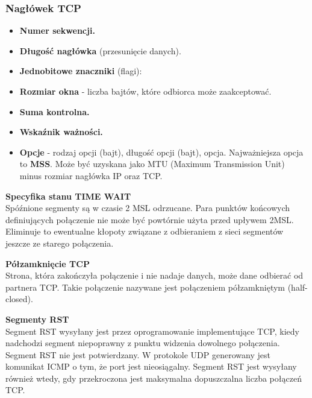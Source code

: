 \documentclass[../main.tex]{subfiles}
\begin{document}
    \subsubsection{Nagłówek TCP}
    \begin{itemize}
        \item \textbf{Numer sekwencji.}\\
        \item \textbf{Długość nagłówka} (przesunięcie danych).\\
        \item \textbf{Jednobitowe znaczniki} (flagi):
        \item \textbf{Rozmiar okna} - liczba bajtów, które odbiorca może zaakceptować.
        \item \textbf{Suma kontrolna.}\\
        \item \textbf{Wskaźnik ważności.}\\
        \item \textbf{Opcje} - rodzaj opcji (bajt), długość opcji (bajt), opcja. Najważniejsza opcja to \textbf{MSS}. Może być uzyskana jako MTU (Maximum Transmission Unit) minus rozmiar nagłówka IP oraz TCP.
    \end{itemize}

    \textbf{Specyfika stanu TIME WAIT}\\
    Spóźnione segmenty są w czasie 2 MSL odrzucane. Para
    punktów końcowych definiujących połączenie nie może być powtórnie użyta przed upływem
    2MSL. Eliminuje to ewentualne kłopoty związane z odbieraniem z sieci segmentów jeszcze ze
    starego połączenia.

    \textbf{Półzamknięcie TCP}\\
    Strona, która zakończyła połączenie i nie nadaje danych, może dane odbierać od partnera
    TCP. Takie połączenie nazywane jest połączeniem półzamkniętym (half-closed).

    \textbf{Segmenty RST}\\
    Segment RST wysyłany jest przez oprogramowanie implementujące TCP, kiedy nadchodzi
    segment niepoprawny z punktu widzenia dowolnego połączenia. Segment RST nie jest potwierdzany. W protokole UDP generowany jest komunikat ICMP o tym, że port jest nieosiągalny.
    Segment RST jest wysyłany również wtedy, gdy przekroczona jest maksymalna dopuszczalna
    liczba połączeń TCP.
\end{document}

